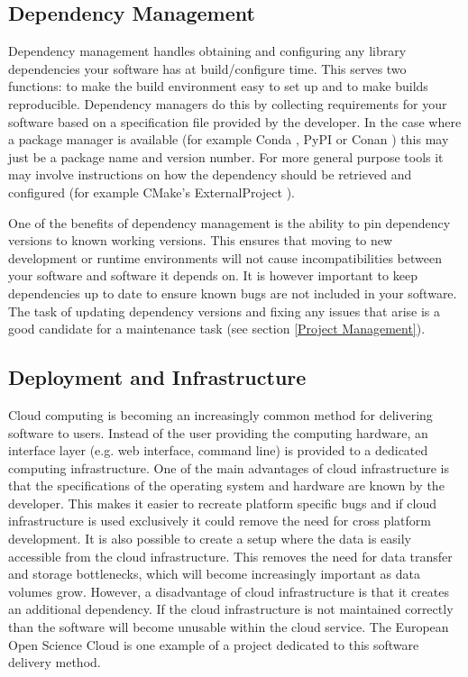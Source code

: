 \documentclass[jnr]{iosart2x}
\begin{document}
\subsection{Dependency Management}
\label{Dependency Management}

Dependency management handles obtaining and configuring any library dependencies your software has at build/configure time.
This serves two functions: to make the build environment easy to set up and to make builds reproducible.
Dependency managers do this by collecting requirements for your software based on a specification file provided by the developer.
In the case where a package manager is available (for example Conda \cite{Conda}, PyPI \cite{PyPI} or Conan \cite{Conan}) this may just be a package name and version number.
For more general purpose tools it may involve instructions on how the dependency should be retrieved and configured (for example CMake's ExternalProject \cite{CMake_ExternalProject}).

One of the benefits of dependency management is the ability to pin dependency versions to known working versions.
This ensures that moving to new development or runtime environments will not cause incompatibilities between your software and software it depends on.
It is however important to keep dependencies up to date to ensure known bugs are not included in your software.
The task of updating dependency versions and fixing any issues that arise is a good candidate for a maintenance task (see section \ref{Project Management}).

\subsection{Deployment and Infrastructure}
\label{Infrastructure}

Cloud computing is becoming an increasingly common method for delivering software to users.
Instead of the user providing the computing hardware, an interface layer (e.g. web interface, command line) is provided to a dedicated computing infrastructure.
One of the main advantages of cloud infrastructure is that the specifications of the operating system and hardware are known by the developer.
This makes it easier to recreate platform specific bugs and if cloud infrastructure is used exclusively it could remove the need for cross platform development.
It is also possible to create a setup where the data is easily accessible from the cloud infrastructure.
This removes the need for data transfer and storage bottlenecks, which will become increasingly important as data volumes grow.
However, a disadvantage of cloud infrastructure is that it creates an additional dependency.
If the cloud infrastructure is not maintained correctly than the software will become unusable within the cloud service.
The European Open Science Cloud \cite{EOSC} is one example of a project dedicated to this software delivery method.
\end{document}
